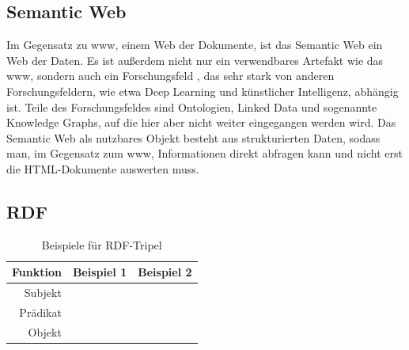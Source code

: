 \subsection{Semantic Web}
Im Gegensatz zu \ac{www}, einem Web der Dokumente, ist das Semantic Web ein Web der Daten.
Es ist außerdem nicht nur ein verwendbares Artefakt wie das \ac{www}, sondern auch ein Forschungsfeld \citep{semanticwebreview}, das sehr stark von anderen Forschungsfeldern, wie etwa Deep Learning und künstlicher Intelligenz, abhängig ist. Teile des Forschungsfeldes sind Ontologien, Linked Data und sogenannte Knowledge Graphs, auf die hier aber nicht weiter eingegangen werden wird.
Das Semantic Web als nutzbares Objekt besteht aus strukturierten Daten, sodass man, im Gegensatz zum \ac{www}, Informationen direkt abfragen kann und nicht erst die HTML-Dokumente auswerten muss.
\subsection{RDF}
\begin{table}[h]\centering\scriptsize
  \begin{tabulary}{\textwidth}{rrl}
    \toprule
    Funktion & Beispiel 1 & Beispiel 2 \\
    \midrule
    Subjekt   &       &             \\
    Prädikat  &  &                       \\
    Objekt    &                &   \\
    \bottomrule
  \end{tabulary}
  \caption{Beispiele für RDF-Tripel}
  \label{tab:rdftripleexample}
\end{table}

